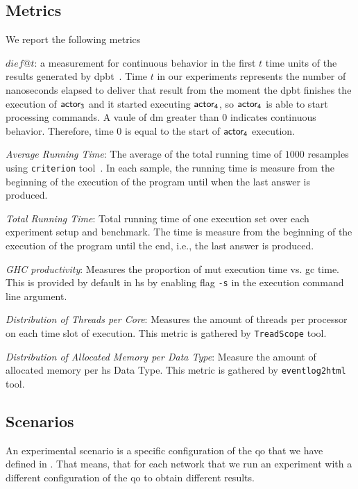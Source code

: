 \subsection{Metrics}\label{sub:metric}
We report the following metrics \begin{inparaenum}[\bf a\upshape)]
      \item {\bf $dief@t$}: a measurement for continuous behavior in the first $t$ time units of the results generated by \acrshort{dpbt}~\cite{diefpaper}. Time $t$ in our experiments represents the number of nanoseconds elapsed to deliver that result from the moment the \acrshort{dpbt} finishes the execution of $\mathsf{actor_3}$ and it started executing $\mathsf{actor_4}$, so $\mathsf{actor_4}$ is able to start processing commands. A vaule of \acrshort{dm} greater than $0$ indicates continuous behavior.
      Therefore, time $0$ is equal to the start of $\mathsf{actor_4}$ execution.
      \item \emph{Average Running Time}: The average of the total running time of $1000$ resamples using \texttt{criterion} tool~\cite{criterion}. In each sample, the running time is measure from the beginning of the execution of the program until when the last answer is produced.
      \item \emph{Total Running Time}: Total running time of one execution set over each experiment setup and benchmark. The time is measure from the beginning of the execution of the program until the end, i.e., the last answer is produced.
      \item \emph{GHC productivity}: Measures the proportion of \acrfull{mut} execution time vs. \acrfull{gc} time. This is provided by default in \acrshort{hs} by enabling flag \texttt{-s} in the execution command line argument.
      \item \emph{Distribution of Threads per Core}: Measures the amount of threads per processor on each time slot of execution. This metric is gathered by \texttt{TreadScope} \cite{threadscope} tool.
      \item \emph{Distribution of Allocated Memory per Data Type}: Measure the amount of allocated memory per \acrshort{hs} Data Type. This metric is gathered by \texttt{eventlog2html} \cite{eventlog2html} tool.
  \end{inparaenum}
    
\subsection{Scenarios}\label{sub:exp:exp-data-setup}
An experimental scenario is a specific configuration of the \acrfull{qo} that we have defined in . 
That means, that for each network that we run an experiment with a different configuration of the \acrshort{qo} to obtain different results.

